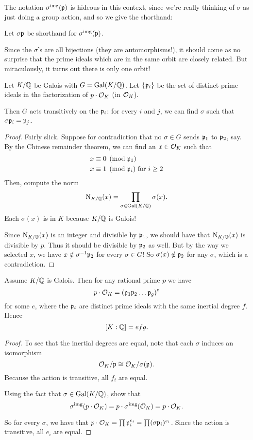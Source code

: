 The notation $\sigma^{\text{img}}(\mathfrak p)$ is hideous in this context,
since we're really thinking of $\sigma$ as just doing a group action,
and so we give the shorthand:
\begin{abuse}
	Let $\sigma\mathfrak p$ be shorthand for $\sigma^{\text{img}}(\mathfrak p)$.
\end{abuse}

Since the $\sigma$'s are all bijections (they are automorphisms!),
it should come as no surprise that the prime ideals which are in the same
orbit are closely related.
But miraculously, it turns out there is only one orbit!
\begin{theorem}
	Let $K/\mathbb Q$ be Galois with $G = \operatorname{Gal}(K/\mathbb Q)$.
	Let $\{\mathfrak p_i\}$ be the set of distinct prime ideals in
	the factorization of $p \cdot \mathcal O_K$ (in $\mathcal O_K$).

	Then $G$ acts transitively on the $\mathfrak p_i$:
	for every $i$ and $j$, we can find $\sigma$ such that $\sigma\mathfrak p_i = \mathfrak p_j$.
\end{theorem}
\begin{proof}
	Fairly slick.
	Suppose for contradiction that no $\sigma \in G$ sends $\mathfrak p_1$ to $\mathfrak p_2$, say.
	By the Chinese remainder theorem, we can find an $x \in \mathcal O_K$ such that
	\begin{align*}
		x &\equiv 0 \pmod{\mathfrak p_1} \\
		x &\equiv 1 \pmod{\mathfrak p_i} \text{ for $i \ge 2$}
	\end{align*}
	Then, compute the norm
	\[ \operatorname{N}_{K/\mathbb Q}(x) = \prod_{\sigma \in \operatorname{Gal}(K/\mathbb Q)} \sigma(x). \]
	Each $\sigma(x)$ is in $K$ because $K/\mathbb Q$ is Galois!

	Since $\operatorname{N}_{K/\mathbb Q}(x)$ is an integer and divisible by $\mathfrak p_1$,
	we should have that $\operatorname{N}_{K/\mathbb Q}(x)$ is divisible by $p$.
	Thus it should be divisible by $\mathfrak p_2$ as well.
	But by the way we selected $x$, we have $x \notin \sigma^{-1}\mathfrak p_2$ for every $\sigma \in G$!
	So $\sigma(x) \notin \mathfrak p_2$ for any $\sigma$, which is a contradiction.
\end{proof}
\begin{theorem}
	Assume $K/\mathbb Q$ is Galois.
	Then for any rational prime $p$ we have
	\[ p \cdot \mathcal O_K = \left( \mathfrak p_1 \mathfrak p_2 \dots \mathfrak p_g \right)^e \]
	for some $e$, where the $\mathfrak p_i$ are distinct prime ideals
	with the same inertial degree $f$.
	Hence \[ [K:\mathbb Q] = efg. \]
\end{theorem}
\begin{proof}
	To see that the inertial degrees are equal, note that each $\sigma$
	induces an isomorphism
	\[ \mathcal O_K / \mathfrak p \cong \mathcal O_K / \sigma(\mathfrak p). \]
	Because the action is transitive, all $f_i$ are equal.
	\begin{exercise}
		Using the fact that $\sigma \in \operatorname{Gal}(K/\mathbb Q)$,
		show that \[ \sigma^{\text{img}}(p \cdot \mathcal O_K) = p \cdot \sigma^{\text{img}}(\mathcal O_K) = p \cdot \mathcal O_K. \]
	\end{exercise}
	So for every $\sigma$, we have that
	$p \cdot \mathcal O_K = \prod \mathfrak p_i^{e_i} = \prod (\sigma\mathfrak p_i)^{e_i}$.
	Since the action is transitive, all $e_i$ are equal.
\end{proof}

